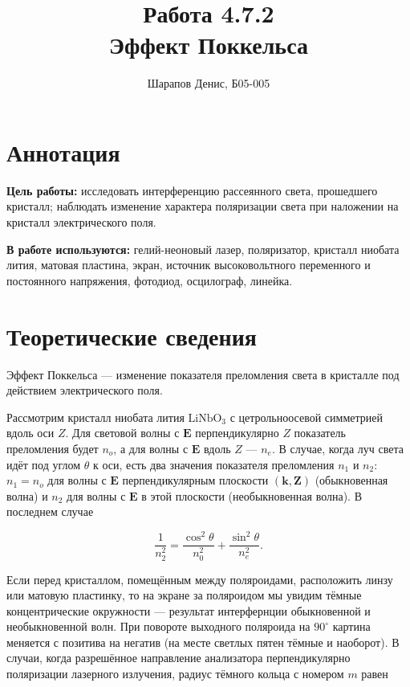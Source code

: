 \documentclass[a4paper]{article}
\title{Работа 4.7.2 \\ Эффект Поккельса}
\author{Шарапов Денис, Б05-005}
\date{}
\begin{document}
    \maketitle
    \tableofcontents
    \newpage
    
\section{Аннотация}

\noindent\textbf{Цель работы:} исследовать интерференцию рассеянного света, прошедшего кристалл; наблюдать изменение характера поляризации света при наложении на кристалл электрического поля.\smallskip
 
\noindent \textbf{В работе используются:} гелий-неоновый лазер, поляризатор, кристалл ниобата лития, матовая пластина, экран, источник высоковольтного переменного и постоянного напряжения, фотодиод, осцилограф, линейка.

\section{Теоретические сведения}

Эффект Поккельса --- изменение показателя преломления света в кристалле под действием электрического поля. \medskip

\noindent Рассмотрим кристалл ниобата лития $\text{LiNbO}_3$ с цетрольноосевой симметрией вдоль оси $Z$. Для световой волны с $\mathbf{E}$ перпендикулярно $Z$ показатель преломления будет $n_o$, а для волны с $\mathbf{E}$ вдоль $Z$ --- $n_e$. В случае, когда луч света идёт под углом $\theta$ к оси, есть два значения показателя преломления $n_1$ и $n_2$: $n_1 = n_o$ для волны с $\mathbf{E}$ перпендикулярным плоскости $(\mathbf{k},\mathbf{Z})$ (обыкновенная волна) и $n_2$ для волны с $\mathbf{E}$ в этой плоскости (необыкновенная волна). В последнем случае

\begin{equation}
\dfrac{1}{n_2^2}=\dfrac{\cos^2 \theta}{n_0^2}+\dfrac{\sin^2 \theta}{n_e^2}.
\end{equation}

\noindent Если перед кристаллом, помещённым между поляроидами, расположить линзу или матовую пластинку, то на экране за поляроидом мы увидим тёмные концентрические окружности --- результат интерфернции обыкновенной и необыкновенной волн. При повороте выходного поляроида на $90^\circ$ картина меняется с позитива на негатив (на месте светлых пятен тёмные и наоборот). В случаи, когда разрешённое направление анализатора перпендикулярно поляризации лазерного излучения, радиус тёмного кольца с номером $m$ равен
\end{document}
